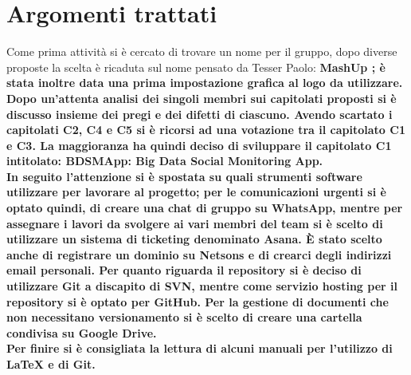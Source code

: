 %

\section{Argomenti trattati}
   Come prima attività si è cercato di trovare un nome per il gruppo, dopo diverse proposte la scelta è ricaduta sul nome pensato da Tesser Paolo: \bfseries{MashUp} \textnormal{; è stata inoltre data una prima impostazione grafica al logo da utilizzare.}\\
   \textnormal{Dopo un'attenta analisi dei singoli membri sui capitolati proposti si è discusso  insieme dei pregi e dei difetti di ciascuno. Avendo scartato i capitolati C2, C4 e C5 si è ricorsi ad una votazione tra il capitolato C1 e C3. La maggioranza ha quindi deciso di sviluppare il capitolato \bfseries{C1} \textnormal{intitolato:} \bfseries{BDSMApp: Big Data Social Monitoring App}\textnormal{.}}\\
  \textnormal{In seguito l'attenzione si è spostata su quali strumenti software utilizzare per lavorare al progetto; per le comunicazioni urgenti si è optato quindi, di creare una chat di gruppo su WhatsApp, mentre per assegnare i lavori da svolgere ai vari membri del team si è scelto di utilizzare un sistema di ticketing denominato Asana.
  È stato scelto anche di registrare un dominio su Netsons e di crearci degli indirizzi email personali.
  Per quanto riguarda il repository si è deciso di utilizzare Git a discapito di SVN, mentre come servizio hosting per il repository si è optato per GitHub. Per la gestione di documenti che non necessitano versionamento si è scelto di creare una cartella condivisa su Google Drive.}\\
  \textnormal{Per finire si è consigliata la lettura di alcuni manuali per l'utilizzo di \LaTeX
   e di Git.}